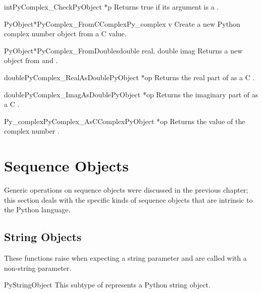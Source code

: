 \documentclass{manual}
\begin{document}
\begin{cfuncdesc}{int}{PyComplex_Check}{PyObject *p}
Returns true if its argument is a .
\end{cfuncdesc}

\begin{cfuncdesc}{PyObject*}{PyComplex_FromCComplex}{Py_complex v}
Create a new Python complex number object from a C
 value.
\end{cfuncdesc}

\begin{cfuncdesc}{PyObject*}{PyComplex_FromDoubles}{double real, double imag}
Returns a new  object from  and .
\end{cfuncdesc}

\begin{cfuncdesc}{double}{PyComplex_RealAsDouble}{PyObject *op}
Returns the real part of  as a C .
\end{cfuncdesc}

\begin{cfuncdesc}{double}{PyComplex_ImagAsDouble}{PyObject *op}
Returns the imaginary part of  as a C .
\end{cfuncdesc}

\begin{cfuncdesc}{Py_complex}{PyComplex_AsCComplex}{PyObject *op}
Returns the  value of the complex number .
\end{cfuncdesc}



\section{Sequence Objects \label{sequenceObjects}}

Generic operations on sequence objects were discussed in the previous 
chapter; this section deals with the specific kinds of sequence 
objects that are intrinsic to the Python language.


\subsection{String Objects \label{stringObjects}}

These functions raise  when expecting a string
parameter and are called with a non-string parameter.

\begin{ctypedesc}{PyStringObject}
This subtype of  represents a Python string object.
\end{ctypedesc}
\end{document}
